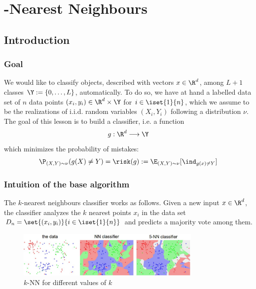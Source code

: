 \documentclass[toc, titlepaged]{../cs-classes/cs-classes}
\begin{document}

\section{-Nearest Neighbours}
\subsection{Introduction}
\subsubsection{Goal}
We would like to classify objects, described with vectors $x\in\R^d$, among $L+1$ classes $\Y:=\{0, \dots, L\}$, automatically. To do so, we have at hand a labelled data set of $n$ data points $(x_i, y_i)\in\R^d\times\Y$ for $i\in\iset{1}{n}$, which we assume to be the realizations of i.i.d. random variables $(X_i, Y_i)$ following a distribution $\nu$. The goal of this lesson is to build a classifier, i.e. a function
\begin{equation*}
    g:\R^d\longrightarrow\Y
\end{equation*}
which minimizes the probability of mistakes:
\begin{equation*}
    \P_{(X, Y)\sim\nu}(g(X)\neq Y) = \risk(g) := \E_{(X, Y)\sim\nu}[\ind_{g(x)\neq Y}]
\end{equation*}

\subsubsection{Intuition of the base algorithm}
The $k$-nearest neighbours classifier works as follows. Given a new input $x\in\R^d$, the classifier analyzes the $k$ nearest points $x_i$ in the data set $D_n=\set{(x_i, y_i)}{i\in\iset{1}{n}}$ and predicts a majority vote among them.

\begin{figure}[H]
    \centering
    \includegraphics[width=0.8\textwidth]{images/knn.jpeg}
    \caption{$k$-NN for different values of $k$}
    \label{fig:knn}
\end{figure}
\end{document}
